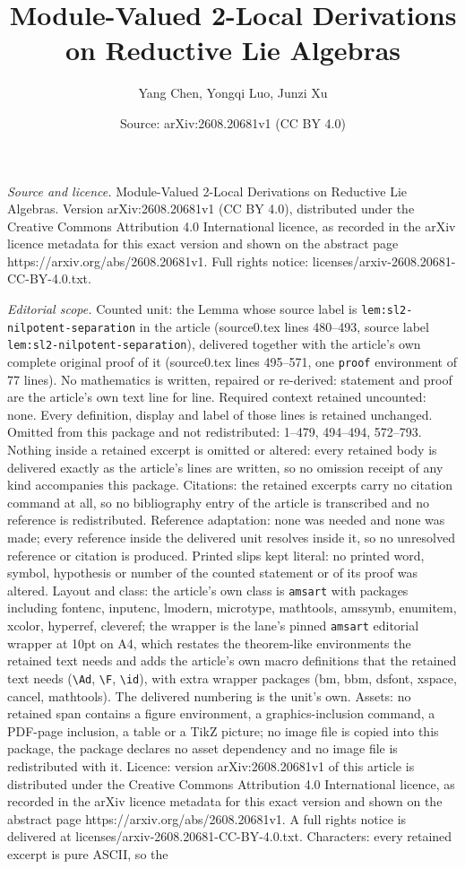 \documentclass[10pt,a4paper]{amsart}
\title[Module-Valued 2-Local Derivations on Reductive Lie Algebras]{Module-Valued 2-Local Derivations on Reductive Lie Algebras}
\author{Yang Chen, Yongqi Luo, Junzi Xu}
\date{Source: arXiv:2608.20681v1 (CC BY 4.0)}
\begin{document}
\maketitle

\noindent\emph{Source and licence.} Module-Valued 2-Local Derivations on Reductive Lie Algebras. Version arXiv:2608.20681v1 (CC BY 4.0), distributed under the Creative Commons Attribution 4.0 International licence, as recorded in the arXiv licence metadata for this exact version and shown on the abstract page https://arxiv.org/abs/2608.20681v1. Full rights notice: licenses/arxiv-2608.20681-CC-BY-4.0.txt.\par\smallskip

\noindent\textit{Editorial scope.} Counted unit: the Lemma whose source label is \texttt{lem:sl2-nilpotent-separation} in the article (source0.tex lines 480--493, source label \texttt{lem:sl2-nilpotent-separation}), delivered together with the article's own complete original proof of it (source0.tex lines 495--571, one \texttt{proof} environment of 77 lines). No mathematics is written, repaired or re-derived: statement and proof are the article's own text line for line. Required context retained uncounted: none. Every definition, display and label of those lines is retained unchanged. Omitted from this package and not redistributed: 1--479, 494--494, 572--793. Nothing inside a retained excerpt is omitted or altered: every retained body is delivered exactly as the article's lines are written, so no omission receipt of any kind accompanies this package. Citations: the retained excerpts carry no citation command at all, so no bibliography entry of the article is transcribed and no reference is redistributed. Reference adaptation: none was needed and none was made; every reference inside the delivered unit resolves inside it, so no unresolved reference or citation is produced. Printed slips kept literal: no printed word, symbol, hypothesis or number of the counted statement or of its proof was altered. Layout and class: the article's own class is \texttt{amsart} with packages including fontenc, inputenc, lmodern, microtype, mathtools, amssymb, enumitem, xcolor, hyperref, cleveref; the wrapper is the lane's pinned \texttt{amsart} editorial wrapper at 10pt on A4, which restates the theorem-like environments the retained text needs and adds the article's own macro definitions that the retained text needs (\texttt{\textbackslash Ad}, \texttt{\textbackslash F}, \texttt{\textbackslash id}), with extra wrapper packages (bm, bbm, dsfont, xspace, cancel, mathtools). The delivered numbering is the unit's own. Assets: no retained span contains a figure environment, a graphics-inclusion command, a PDF-page inclusion, a table or a TikZ picture; no image file is copied into this package, the package declares no asset dependency and no image file is redistributed with it. Licence: version arXiv:2608.20681v1 of this article is distributed under the Creative Commons Attribution 4.0 International licence, as recorded in the arXiv licence metadata for this exact version and shown on the abstract page https://arxiv.org/abs/2608.20681v1. A full rights notice is delivered at licenses/arxiv-2608.20681-CC-BY-4.0.txt. Characters: every retained excerpt is pure ASCII, so the 
\end{document}
